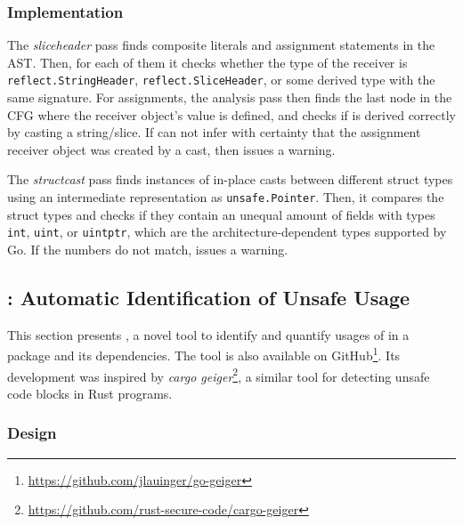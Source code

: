 




\subsubsection*{Implementation}

The \textit{sliceheader} pass finds composite literals and assignment statements in the AST.
Then, for each of them it checks whether the type of the %
receiver is \texttt{reflect.StringHeader}, \texttt{reflect.SliceHeader}, or some derived type with the same signature.
For assignments, the analysis pass then finds the last node in the CFG where the receiver object's value is defined, and checks if is derived correctly by casting a string/slice.
If \toolSA{} can not infer with certainty that the assignment receiver object was created by a cast, then \toolSA{} issues a warning.

The \textit{structcast} pass finds instances of in-place casts between different struct types using an intermediate representation as \texttt{unsafe.Pointer}.
Then, it compares the struct types and checks if they contain an unequal amount of fields with types \texttt{int}, \texttt{uint}, or \texttt{uintptr}, which are the architecture-dependent types supported by Go.
If the numbers do not match, \toolSA{} issues a warning.



\subsection{\toolUsage{}: Automatic Identification of Unsafe Usage}

This section presents \toolUsage{}, a novel tool to identify and quantify usages of \unsafe{} in a package and its dependencies.
The \toolUsage{} tool is also available on GitHub\footnote{\url{https://github.com/jlauinger/go-geiger}}.
Its development was inspired by \textit{cargo geiger}\footnote{\url{https://github.com/rust-secure-code/cargo-geiger}}, a similar tool for detecting unsafe code blocks in Rust programs.

\subsubsection*{Design}

